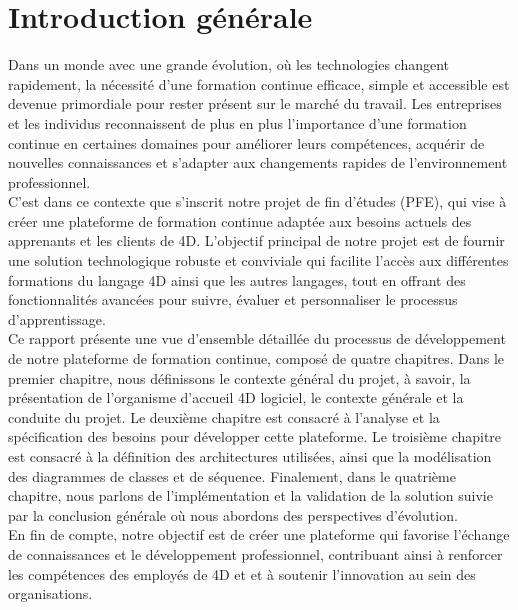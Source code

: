 \chapter*{Introduction générale}


Dans un monde avec une grande évolution, où les technologies changent rapidement, la nécessité d'une formation continue efficace, simple et accessible est devenue primordiale pour rester présent sur le marché du travail. Les entreprises et les individus reconnaissent de plus en plus l’importance d'une formation continue en certaines domaines pour améliorer leurs compétences, acquérir de nouvelles connaissances et s'adapter aux changements rapides de l'environnement professionnel.\\

C'est dans ce contexte que s'inscrit notre projet de fin d'études (PFE), qui vise à créer une plateforme de formation continue adaptée aux besoins actuels des apprenants et les clients de 4D. L’objectif principal de notre projet est de fournir une solution technologique robuste et conviviale qui facilite l'accès aux différentes formations du langage 4D ainsi que les autres langages, tout en offrant des fonctionnalités avancées pour suivre, évaluer et personnaliser le processus d'apprentissage.\\

Ce rapport présente une vue d'ensemble détaillée du processus de développement de notre plateforme de formation continue, composé de quatre chapitres. Dans le premier chapitre, nous définissons le contexte général du projet, à savoir, la présentation de l’organisme d’accueil 4D logiciel, le contexte générale et la conduite du projet. Le deuxième chapitre est consacré à l’analyse et la spécification des besoins pour développer cette plateforme. Le troisième chapitre est consacré à la définition des architectures utilisées, ainsi que la modélisation des diagrammes de classes et de séquence. Finalement, dans le quatrième chapitre, nous parlons de l’implémentation et la validation de la solution suivie par la conclusion générale où nous abordons des perspectives d’évolution.\\

En fin de compte, notre objectif est de créer une plateforme qui favorise l'échange de connaissances et le développement professionnel, contribuant ainsi à renforcer les compétences des employés de 4D et  et à soutenir l'innovation au sein des organisations.